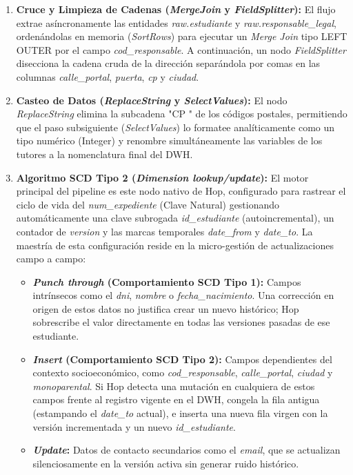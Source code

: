 \begin{enumerate}
    \item \textbf{Cruce y Limpieza de Cadenas (\textit{MergeJoin} y \textit{FieldSplitter}):} El flujo extrae asíncronamente las entidades \textit{raw.estudiante} y \textit{raw.responsable\_legal}, ordenándolas en memoria (\textit{SortRows}) para ejecutar un \textit{Merge Join} tipo LEFT OUTER por el campo \textit{cod\_responsable}. A continuación, un nodo \textit{FieldSplitter} disecciona la cadena cruda de la dirección separándola por comas en las columnas \textit{calle\_portal}, \textit{puerta}, \textit{cp} y \textit{ciudad}.
    \item \textbf{Casteo de Datos (\textit{ReplaceString} y \textit{SelectValues}):} El nodo \textit{ReplaceString} elimina la subcadena "CP " de los códigos postales, permitiendo que el paso subsiguiente (\textit{SelectValues}) lo formatee analíticamente como un tipo numérico (Integer) y renombre simultáneamente las variables de los tutores a la nomenclatura final del DWH.
    \item \textbf{Algoritmo SCD Tipo 2 (\textit{Dimension lookup/update}):} El motor principal del pipeline es este nodo nativo de Hop, configurado para rastrear el ciclo de vida del \textit{num\_expediente} (Clave Natural) gestionando automáticamente una clave subrogada \textit{id\_estudiante} (autoincremental), un contador de \textit{version} y las marcas temporales \textit{date\_from} y \textit{date\_to}. La maestría de esta configuración reside en la micro-gestión de actualizaciones campo a campo:
    \begin{itemize}
        \item \textbf{\textit{Punch through} (Comportamiento SCD Tipo 1):} Campos intrínsecos como el \textit{dni}, \textit{nombre} o \textit{fecha\_nacimiento}. Una corrección en origen de estos datos no justifica crear un nuevo histórico; Hop sobrescribe el valor directamente en todas las versiones pasadas de ese estudiante.
        \item \textbf{\textit{Insert} (Comportamiento SCD Tipo 2):} Campos dependientes del contexto socioeconómico, como \textit{cod\_responsable}, \textit{calle\_portal}, \textit{ciudad} y \textit{monoparental}. Si Hop detecta una mutación en cualquiera de estos campos frente al registro vigente en el DWH, congela la fila antigua (estampando el \textit{date\_to} actual), e inserta una nueva fila virgen con la versión incrementada y un nuevo \textit{id\_estudiante}.
        \item \textbf{\textit{Update}:} Datos de contacto secundarios como el \textit{email}, que se actualizan silenciosamente en la versión activa sin generar ruido histórico.
    \end{itemize}
\end{enumerate}

